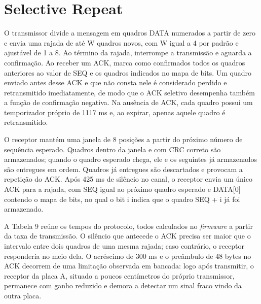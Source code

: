 \documentclass[12pt, oneside, a4paper, sumario=tradicional, chapter=TITLE, brazilian]{abntex2}
\begin{document}
\section{Selective Repeat}

O transmissor divide a mensagem em quadros DATA numerados a partir de zero e envia uma rajada de até W quadros novos, com W igual a 4 por padrão e ajustável de 1 a 8. Ao término da rajada, interrompe a transmissão e aguarda a confirmação. Ao receber um ACK, marca como confirmados todos os quadros anteriores ao valor de SEQ e os quadros indicados no mapa de bits. Um quadro enviado antes desse ACK e que não consta nele é considerado perdido e retransmitido imediatamente, de modo que o ACK seletivo desempenha também a função de confirmação negativa. Na ausência de ACK, cada quadro possui um temporizador próprio de 1117 ms e, ao expirar, apenas aquele quadro é retransmitido.

O receptor mantém uma janela de 8 posições a partir do próximo número de sequência esperado. Quadros dentro da janela e com CRC correto são armazenados; quando o quadro esperado chega, ele e os seguintes já armazenados são entregues em ordem. Quadros já entregues são descartados e provocam a repetição do ACK. Após 425 ms de silêncio no canal, o receptor envia um único ACK para a rajada, com SEQ igual ao próximo quadro esperado e DATA[0] contendo o mapa de bits, no qual o bit i indica que o quadro SEQ + i já foi armazenado.

A Tabela 9 reúne os tempos do protocolo, todos calculados no \textit{firmware} a partir da taxa de transmissão. O silêncio que antecede o ACK precisa ser maior que o intervalo entre dois quadros de uma mesma rajada; caso contrário, o receptor responderia no meio dela. O acréscimo de 300 ms e o preâmbulo de 48 bytes no ACK decorrem de uma limitação observada em bancada: logo após transmitir, o receptor da placa A, situado a poucos centímetros do próprio transmissor, permanece com ganho reduzido e demora a detectar um sinal fraco vindo da outra placa.
\end{document}
